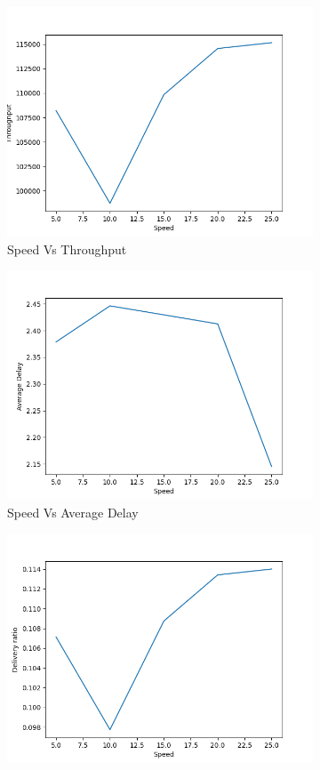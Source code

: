\begin{figure}[h]
\begin{subfigure}{.5\textwidth}
  \centering
  \includegraphics[width=.8\linewidth]{_11_2_mobile/SpeedvsThroughput.png}
     \caption{Speed Vs Throughput}
    \label{speed_throughput_mobile}
\end{subfigure}
\begin{subfigure}{.5\textwidth}
  \centering
  \includegraphics[width=.8\linewidth]{_11_2_mobile/SpeedvsAverageDelay.png}
    \caption{Speed Vs Average Delay}
     \label{speed_delay_mobile}
\end{subfigure}
\begin{subfigure}{.5\textwidth}
  \centering
  \includegraphics[width=.8\linewidth]{_11_2_mobile/SpeedvsDeliveryRatio.png}

\end{subfigure}
\end{figure}
